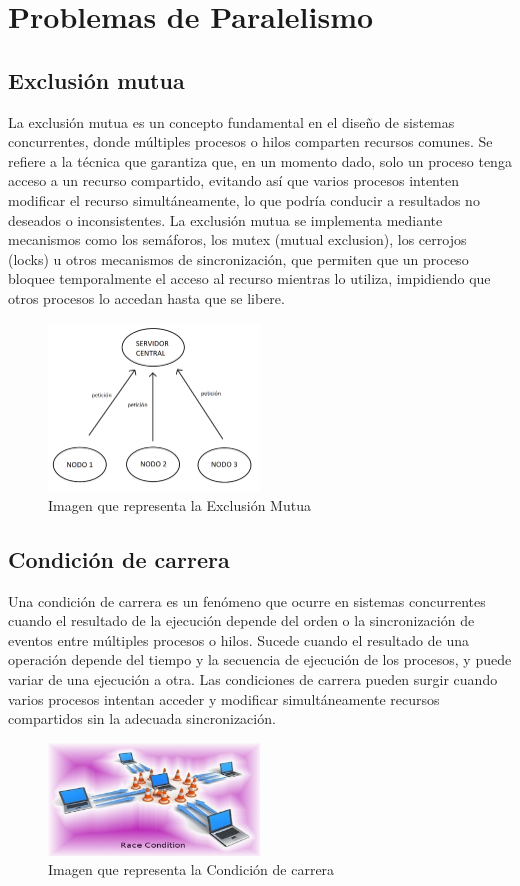 \documentclass[12pt,a4paper]{article}
\begin{document}
\section{Problemas de Paralelismo}
\subsection{Exclusión mutua}

La exclusión mutua es un concepto fundamental en el diseño de sistemas concurrentes, donde múltiples procesos o hilos comparten recursos comunes. Se refiere a la técnica que garantiza que, en un momento dado, solo un proceso tenga acceso a un recurso compartido, evitando así que varios procesos intenten modificar el recurso simultáneamente, lo que podría conducir a resultados no deseados o inconsistentes. La exclusión mutua se implementa mediante mecanismos como los semáforos, los mutex (mutual exclusion), los cerrojos (locks) u otros mecanismos de sincronización, que permiten que un proceso bloquee temporalmente el acceso al recurso mientras lo utiliza, impidiendo que otros procesos lo accedan hasta que se libere.
\begin{figure}[h]
    \centering
    \caption{Imagen que representa la Exclusión Mutua } 
    \includegraphics[width=0.5\textwidth]{images/exclusion_mutua.png}
    
\end{figure}
\subsection{Condición de carrera}
Una condición de carrera es un fenómeno que ocurre en sistemas concurrentes cuando el resultado de la ejecución depende del orden o la sincronización de eventos entre múltiples procesos o hilos. Sucede cuando el resultado de una operación depende del tiempo y la secuencia de ejecución de los procesos, y puede variar de una ejecución a otra. Las condiciones de carrera pueden surgir cuando varios procesos intentan acceder y modificar simultáneamente recursos compartidos sin la adecuada sincronización.
\begin{figure}[h]
    \centering
    \caption{Imagen que representa la Condición de carrera } 
    \includegraphics[width=0.5\textwidth]{images/condicion_carrera.png}
    
\end{figure}
\end{document}
